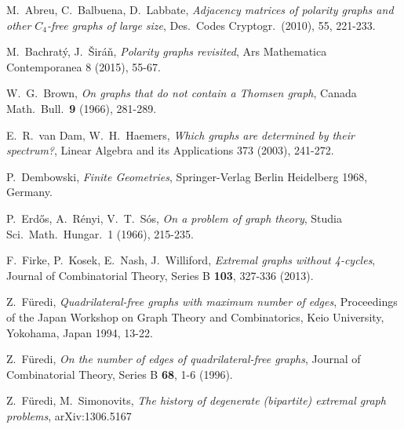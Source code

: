 \documentclass[12pt]{article}
\begin{document}
\begin{thebibliography}{10}

    M.\ Abreu, C.\ Balbuena, D.\ Labbate,
    {\em Adjacency matrices of polarity graphs and other $C_4$-free graphs of large size},
    Des.\ Codes Cryptogr.\ (2010), 55, 221-233.


    M.\ Bachrat\'{y}, J.\ \v{S}ir\'{a}\v{n},
    {\em Polarity graphs revisited},
    Ars Mathematica Contemporanea 8 (2015), 55-67.

    W.\ G.\ Brown,
    {\em On graphs that do not contain a Thomsen graph},
    Canada Math.\ Bull.\ {\bf 9} (1966), 281-289.

    E.\ R.\ van Dam, W.\ H.\ Haemers,
    {\em Which graphs are determined by their spectrum?},
    Linear Algebra and its Applications 373 (2003), 241-272.

    P.\ Dembowski,
    {\em Finite Geometries},
    Springer-Verlag Berlin Heidelberg 1968, Germany.

    P.\ Erd\H{o}s, A.\ R\'{e}nyi, V.\ T.\ S\'{o}s,
    {\em On a problem of graph theory},
    Studia Sci.\ Math.\ Hungar.\ 1 (1966), 215-235.

    F.\ Firke, P.\ Kosek, E.\ Nash, J.\ Williford,
    {\em Extremal graphs without 4-cycles}, Journal of Combinatorial Theory, Series B {\bf 103}, 327-336 (2013).


    Z.\ F\"{u}redi,
    {\em Quadrilateral-free graphs with maximum number of edges},
    Proceedings of the Japan Workshop on Graph Theory and Combinatorics,
    Keio University, Yokohama, Japan 1994, 13-22.

    Z.\ F\"{u}redi,
    {\em On the number of edges of quadrilateral-free graphs},
    Journal of Combinatorial Theory, Series B {\bf 68}, 1-6 (1996).

    Z.\ F\"{u}redi, M.\ Simonovits,
    {\em The history of degenerate (bipartite) extremal graph problems},
    arXiv:1306.5167


\end{thebibliography}
\end{document}
